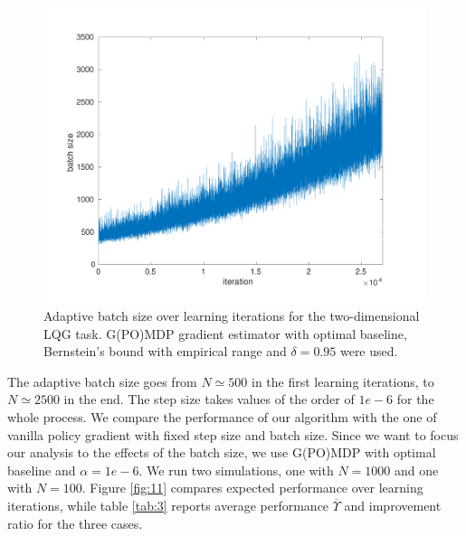 \begin{figure}[h!]
\includegraphics[width = \textwidth,left]{Images/lqg2d_batchsize_landscape.pdf}
\caption[Adaptive batch size over learning iterations in the two-dimensional LQG task.]{Adaptive batch size over learning iterations for the two-dimensional \ac{LQG} task. G(PO)MDP gradient estimator with optimal baseline, Bernstein's bound with empirical range and $\delta=0.95$ were used.}
\label{fig:10}
\end{figure}

The adaptive batch size goes from $N \simeq 500$ in the first learning iterations, to $N\simeq2500$ in the end. The step size takes values of the order of $1e-6$ for the whole process.
We compare the performance of our algorithm with the one of vanilla policy gradient with fixed step size and batch size. Since we want to focus our analysis to the effects of the batch size, we use G(PO)MDP with optimal baseline and $\alpha=1e-6$. We run two simulations, one with $N=1000$ and one with $N=100$. Figure \ref{fig:11} compares expected performance over learning iterations, while table \ref{tab:3} reports average performance $\overline{\Upsilon}$ and improvement ratio for the three cases.

